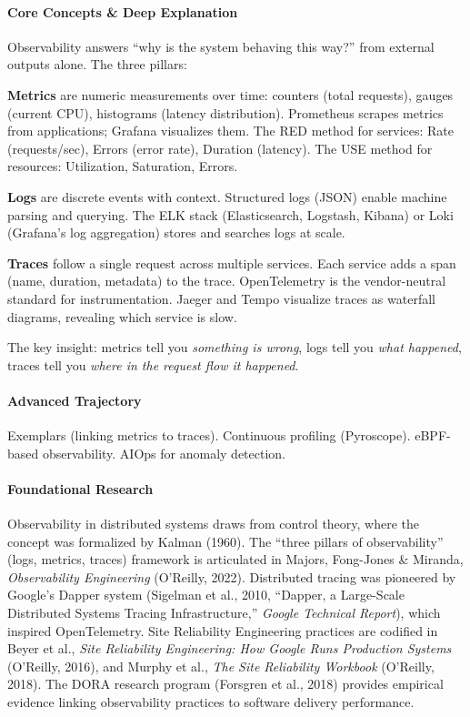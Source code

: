 \documentclass[11pt, a4paper, oneside]{report}
\begin{document}
\paragraph{Core Concepts \& Deep Explanation} Observability answers ``why is the system behaving this way?'' from external outputs alone. The three pillars:

\textbf{Metrics} are numeric measurements over time: counters (total requests), gauges (current CPU), histograms (latency distribution). Prometheus scrapes metrics from applications; Grafana visualizes them. The RED method for services: Rate (requests/sec), Errors (error rate), Duration (latency). The USE method for resources: Utilization, Saturation, Errors.

\textbf{Logs} are discrete events with context. Structured logs (JSON) enable machine parsing and querying. The ELK stack (Elasticsearch, Logstash, Kibana) or Loki (Grafana's log aggregation) stores and searches logs at scale.

\textbf{Traces} follow a single request across multiple services. Each service adds a span (name, duration, metadata) to the trace. OpenTelemetry is the vendor-neutral standard for instrumentation. Jaeger and Tempo visualize traces as waterfall diagrams, revealing which service is slow.

The key insight: metrics tell you \emph{something is wrong}, logs tell you \emph{what happened}, traces tell you \emph{where in the request flow it happened}.

\paragraph{Advanced Trajectory} Exemplars (linking metrics to traces). Continuous profiling (Pyroscope). eBPF-based observability. AIOps for anomaly detection.


\paragraph{Foundational Research} Observability in distributed systems draws from control theory, where the concept was formalized by Kalman (1960). The ``three pillars of observability'' (logs, metrics, traces) framework is articulated in Majors, Fong-Jones \& Miranda, \emph{Observability Engineering} (O'Reilly, 2022). Distributed tracing was pioneered by Google's Dapper system (Sigelman et al., 2010, ``Dapper, a Large-Scale Distributed Systems Tracing Infrastructure,'' \emph{Google Technical Report}), which inspired OpenTelemetry. Site Reliability Engineering practices are codified in Beyer et al., \emph{Site Reliability Engineering: How Google Runs Production Systems} (O'Reilly, 2016), and Murphy et al., \emph{The Site Reliability Workbook} (O'Reilly, 2018). The DORA research program (Forsgren et al., 2018) provides empirical evidence linking observability practices to software delivery performance.
\end{document}
